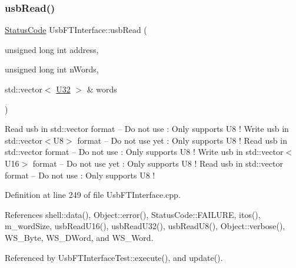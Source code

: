 \subsubsection{\texorpdfstring{usb\+Read()}{usbRead()}}
{\footnotesize\ttfamily \hyperlink{classStatusCode}{Status\+Code} Usb\+F\+T\+Interface\+::usb\+Read (\begin{DoxyParamCaption}\item[{unsigned long int}]{address,  }\item[{unsigned long int}]{n\+Words,  }\item[{std\+::vector$<$ \hyperlink{classUsbFTInterface_aee2201fe4d977aa03568fa8dbacc39ba}{U32} $>$ \&}]{words }\end{DoxyParamCaption})}

Read usb in std\+::vector format -- Do not use \+: Only supports U8 ! Write usb in std\+::vector$<$\+U8$>$ format -- Do not use yet \+: Only supports U8 ! Read usb in std\+::vector format -- Do not use \+: Only supports U8 ! Write usb in std\+::vector$<$\+U16$>$ format -- Do not use yet \+: Only supports U8 ! Read usb in std\+::vector format -- Do not use \+: Only supports U8 ! 

Definition at line 249 of file Usb\+F\+T\+Interface.\+cpp.



References shell\+::data(), Object\+::error(), Status\+Code\+::\+F\+A\+I\+L\+U\+RE, itos(), m\+\_\+word\+Size, usb\+Read\+U16(), usb\+Read\+U32(), usb\+Read\+U8(), Object\+::verbose(), W\+S\+\_\+\+Byte, W\+S\+\_\+\+D\+Word, and W\+S\+\_\+\+Word.



Referenced by Usb\+F\+T\+Interface\+Test\+::execute(), and update().


